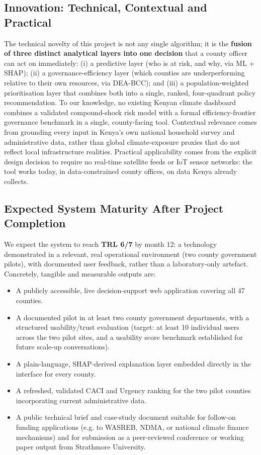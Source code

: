 \documentclass[12pt,a4paper]{article}
\begin{document}
\subsection{Innovation: Technical, Contextual and Practical}
The technical novelty of this project is not any single algorithm; it is the \textbf{fusion of three distinct analytical layers into one decision} that a county officer can act on immediately: (i) a predictive layer (who is at risk, and why, via ML + SHAP); (ii) a governance-efficiency layer (which counties are underperforming relative to their own resources, via DEA-BCC); and (iii) a population-weighted prioritisation layer that combines both into a single, ranked, four-quadrant policy recommendation. To our knowledge, no existing Kenyan climate dashboard combines a validated compound-shock risk model with a formal efficiency-frontier governance benchmark in a single, county-facing tool. Contextual relevance comes from grounding every input in Kenya's own national household survey and administrative data, rather than global climate-exposure proxies that do not reflect local infrastructure realities. Practical applicability comes from the explicit design decision to require no real-time satellite feeds or IoT sensor networks: the tool works today, in data-constrained county offices, on data Kenya already collects.

\subsection{Expected System Maturity After Project Completion}
We expect the system to reach \textbf{TRL 6/7} by month 12: a technology demonstrated in a relevant, real operational environment (two county government pilots), with documented user feedback, rather than a laboratory-only artefact. Concretely, tangible and measurable outputs are:

\begin{itemize}[leftmargin=1.2em]
\item A publicly accessible, live decision-support web application covering all 47 counties.
\item A documented pilot in at least two county government departments, with a structured usability/trust evaluation (target: at least 10 individual users across the two pilot sites, and a usability score benchmark established for future scale-up conversations).
\item A plain-language, SHAP-derived explanation layer embedded directly in the interface for every county.
\item A refreshed, validated CACI and Urgency ranking for the two pilot counties incorporating current administrative data.
\item A public technical brief and case-study document suitable for follow-on funding applications (e.g. to WASREB, NDMA, or national climate finance mechanisms) and for submission as a peer-reviewed conference or working paper output from Strathmore University.
\end{itemize}
\end{document}
